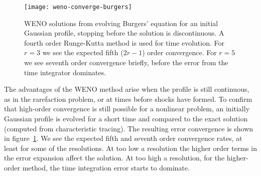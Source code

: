 \begin{figure}[t]
\centering
\texttt{[image: weno-converge-burgers]}
\caption[WENO convergence rates for Burgers' equation]
{\label{fig:weno-converge-burgers} WENO solutions from evolving Burgers'
equation for an initial Gaussian profile, stopping before the solution is
discontinuous. A fourth order Runge-Kutta method is used for time evolution.
For $r=3$ we see the expected fifth ($2 r - 1$) order convergence.
For $r=5$ we see seventh order convergence briefly, before the error from the
time integrator dominates. \\
}
\end{figure}
%

The advantages of the WENO method arise when the profile is still continuous, as
in the rarefaction problem, or at times before shocks have formed. To confirm
that high-order convergence is still possible for a nonlinear problem, an
initially Gaussian profile is evolved for a short time and compared to the
exact solution (computed from characteristic tracing). The resulting error
convergence is shown in figure~\ref{fig:weno-converge-burgers}. We see the
expected fifth and seventh order convergence rates, at least for some of the
resolutions. At too low a resolution the higher order terms in the error
expansion affect the solution. At too high a resolution, for the higher-order
method, the time integration error starts to dominate.
